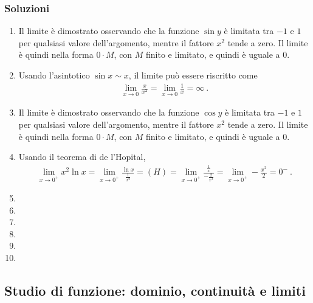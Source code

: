 \documentclass[letterpaper,10pt,italian]{jupyterBook}
\begin{document}
\subsubsection*{Soluzioni}
\begin{enumerate}
%
\item {} 
\sphinxAtStartPar
Il limite è dimostrato osservando che la funzione \(\sin y\) è limitata tra \(-1\) e \(1\) per qualsiasi valore dell’argomento, mentre il fattore \(x^2\) tende a zero. Il limite è quindi nella forma \(0 \cdot M\), con \(M\) finito e limitato, e quindi è uguale a \(0\).

\item {} 
\sphinxAtStartPar
Usando l’asintotico \(\sin x \sim x\), il limite può essere riscritto come
\begin{equation*}
\begin{split}\lim_{x \to 0} \frac{x}{x^2} = \lim_{x \to 0} \frac{1}{x} = \infty \ .\end{split}
\end{equation*}
\item {} 
\sphinxAtStartPar
Il limite è dimostrato osservando che la funzione \(\cos y\) è limitata tra \(-1\) e \(1\) per qualsiasi valore dell’argomento, mentre il fattore \(x^2\) tende a zero. Il limite è quindi nella forma \(0 \cdot M\), con \(M\) finito e limitato, e quindi è uguale a \(0\).

\item {} 
\sphinxAtStartPar
Usando il teorema di de l’Hopital,
\begin{equation*}
\begin{split}\lim_{x \to 0^+} x^2 \ln x = \lim_{x \to 0^+} \frac{\ln x}{\frac{1}{x^2}} = (H) = \lim_{x \to 0^+} \frac{\frac{1}{x}}{-\frac{2}{x^3}} = \lim_{x \to 0^+} -\frac{x^2}{2} = 0^- \ .\end{split}
\end{equation*}
\item {} 
\item {} 
\item {} 
\item {} 
\item {} 
\item {} 
\end{enumerate}


\subsection{Studio di funzione: dominio, continuità e limiti}
\label{\detokenize{ch/infinitesimal_calculus/analysis-problems:studio-di-funzione-dominio-continuita-e-limiti}}\label{\detokenize{ch/infinitesimal_calculus/analysis-problems:infinitesimal-calculus-analysis-problems-funs}} \label{exercise:ch/infinitesimal_calculus/analysis-problems-exercise-6}
\end{document}
